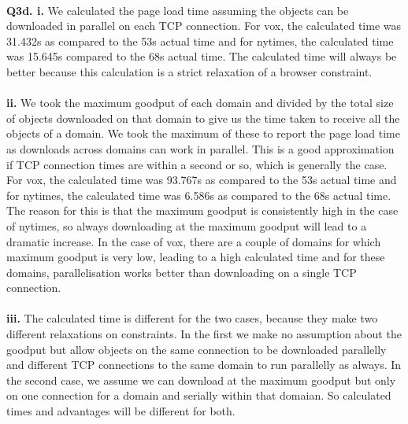 \documentclass[12pt]{article}
\begin{document}
~\\\textbf{Q3d. i.} We calculated the page load time assuming the objects can be downloaded in parallel on each TCP connection. For vox, the calculated time was 31.432s as compared to the 53s actual time and for nytimes, the calculated time was 15.645s compared to the 68s actual time. The calculated time will always be better because this calculation is a strict relaxation of a browser constraint.
\\\\ \textbf{ii.} We took the maximum goodput of each domain and divided by the total size of objects downloaded on that domain to give us the time taken to receive all the objects of a domain. We took the maximum of these to report the page load time as downloads across domains can work in parallel. This is a good approximation if TCP connection times are within a second or so, which is generally the case.
For vox, the calculated time was 93.767s as compared to the 53s actual time and for nytimes, the calculated time was 6.586s as compared to the 68s actual time. The reason for this is that the maximum goodput is consistently high in the case of nytimes, so always downloading at the maximum goodput will lead to a dramatic increase. In the case of vox, there are a couple of domains for which maximum goodput is very low, leading to a high calculated time and for these domains, parallelisation works better than downloading on a single TCP connection.
\\\\ \textbf{iii.} The calculated time is different for the two cases, because they make two different relaxations on constraints. In the first we make no assumption about the goodput but allow objects on the same connection to be downloaded parallelly and different TCP connections to the same domain to run parallelly as always. In the second case, we assume we can download at the maximum goodput but only on one connection for a domain and serially within that domaian. So calculated times and advantages will be different for both.
\end{document}
